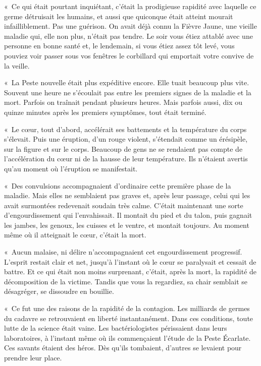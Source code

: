 \documentclass[french,twoside]{book} %
\begin{document}
« Ce qui était pourtant inquiétant, c’était la prodigieuse rapidité avec laquelle ce germe détruisait les humains, et aussi que quiconque était atteint mourait infailliblement. Pas une guérison. On avait déjà connu la Fièvre Jaune, une vieille maladie qui, elle non plus, n’était pas tendre. Le soir vous étiez attablé avec une personne en bonne santé et, le lendemain, si vous étiez assez tôt levé, vous pouviez voir passer sous vos fenêtres le corbillard qui emportait votre convive de la veille.\par
« La Peste nouvelle était plus expéditive encore. Elle tuait beaucoup plus vite. Souvent une heure ne s’écoulait pas entre les premiers signes de la maladie et la mort. Parfois on traînait pendant plusieurs heures. Mais parfois aussi, dix ou quinze minutes après les premiers symptômes, tout était terminé.\par
« Le cœur, tout d’abord, accélérait ses battements et la température du corps s’élevait. Puis une éruption, d’un rouge violent, s’étendait comme un érésipèle, sur la figure et sur le corps. Beaucoup de gens ne se rendaient pas compte de l’accélération du cœur ni de la hausse de leur température. Ils n’étaient avertis qu’au moment où l’éruption se manifestait.\par
« Des convulsions accompagnaient d’ordinaire cette première phase de la maladie. Mais elles ne semblaient pas graves et, après leur passage, celui qui les avait surmontées redevenait soudain très calme. C’était maintenant une sorte d’engourdissement qui l’envahissait. Il montait du pied et du talon, puis gagnait les jambes, les genoux, les cuisses et le ventre, et montait toujours. Au moment même où il atteignait le cœur, c’était la mort.\par
« Aucun malaise, ni délire n’accompagnaient cet engourdissement progressif. L’esprit restait clair et net, jusqu’à l’instant où le cœur se paralysait et cessait de battre. Et ce qui était non moins surprenant, c’était, après la mort, la rapidité de décomposition de la victime. Tandis que vous la regardiez, sa chair semblait se désagréger, se dissoudre en bouillie.\par
« Ce fut une des raisons de la rapidité de la contagion. Les milliards de germes du cadavre se retrouvaient en liberté instantanément. Dans ces conditions, toute lutte de la science était vaine. Les bactériologistes périssaient dans leurs laboratoires, à l’instant même où ils commençaient l’étude de la Peste Écarlate. Ces savants étaient des héros. Dès qu’ils tombaient, d’autres se levaient pour prendre leur place.\par
\end{document}
